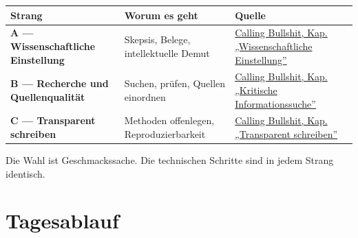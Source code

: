 \documentclass[
  ngerman,
  a4paper,
  DIV=11]{scrreprt}
\begin{document}
\begin{longtable}[]{@{}
  >{\raggedright\arraybackslash}p{}
  >{\raggedright\arraybackslash}p{}
  >{\raggedright\arraybackslash}p{}@{}}
\toprule\noalign{}
\begin{minipage}[b]{\linewidth}\raggedright
Strang
\end{minipage} & \begin{minipage}[b]{\linewidth}\raggedright
Worum es geht
\end{minipage} & \begin{minipage}[b]{\linewidth}\raggedright
Quelle
\end{minipage} \\
\midrule\noalign{}
\endhead
\bottomrule\noalign{}
\endlastfoot
\textbf{A --- Wissenschaftliche Einstellung} & Skepsis, Belege,
intellektuelle Demut &
\href{https://publish.obsidian.md/wagp-calling-bullshit/wissenschaftliche+Einstellung}{Calling
Bullshit, Kap. „Wissenschaftliche Einstellung''} \\
\textbf{B --- Recherche und Quellenqualität} & Suchen, prüfen, Quellen
einordnen &
\href{https://publish.obsidian.md/wagp-calling-bullshit/Kritische+Informationssuche}{Calling
Bullshit, Kap. „Kritische Informationssuche''} \\
\textbf{C --- Transparent schreiben} & Methoden offenlegen,
Reproduzierbarkeit &
\href{https://publish.obsidian.md/wagp-calling-bullshit/Transparent+schreiben}{Calling
Bullshit, Kap. „Transparent schreiben''} \\
\end{longtable}

Die Wahl ist Geschmackssache. Die technischen Schritte sind in jedem
Strang identisch.

\section{Tagesablauf}\label{tagesablauf}
\end{document}
